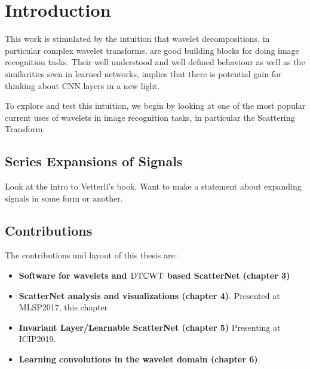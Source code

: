 \chapter{Introduction}\label{ch:intro}

This work is stimulated by the intuition that wavelet decompositions, in particular
complex wavelet transforms, are good building blocks for doing image recognition
tasks. Their well understood and well defined behaviour as well as the
similarities seen in learned networks, implies that there is potential gain for
thinking about CNN layers in a new light. 

To explore and test this intuition, we begin by looking at one of the most popular current uses of
wavelets in image recognition tasks, in particular the Scattering Transform. 

\section{Series Expansions of Signals}
Look at the intro to Vetterli's book. Want to make a statement about expanding
signals in some form or another.

\section{Contributions}
The contributions and layout of this thesis are:

\begin{itemize}
  \item \textbf{Software for wavelets and $\mathrm{DT}\mathbb{C}\mathrm{WT}$ based ScatterNet (chapter 3)}
  \item \textbf{ScatterNet analysis and visualizations (chapter 4)}. Presented
    at MLSP2017, this chapter 
  \item \textbf{Invariant Layer/Learnable ScatterNet (chapter 5)} Presenting at
    ICIP2019.
  \item \textbf{Learning convolutions in the wavelet domain (chapter 6)}.
\end{itemize}

